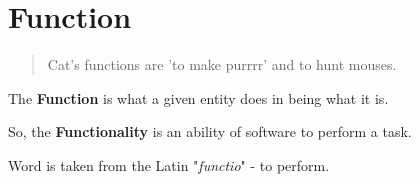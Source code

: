 \section{Function}
\label{sec:Function}

\begin{quote}
 Cat's functions are 'to make purrrr' and to hunt mouses.
\end{quote} 

The \textbf{Function} is what a given entity does in being what it is.

So, the \textbf{Functionality} is an ability of software to perform a task.

Word is taken from the Latin "\textit{functio}" - to perform.